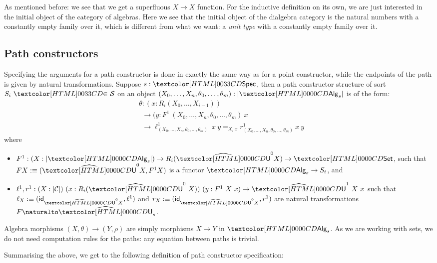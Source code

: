 \begin{remark}
  As mentioned before: we see that we get a superfluous $X \to X$
  function. For the inductive definition on its own, we are just
  interested in the initial object of the category of algebras. Here
  we see that the initial object of the dialgebra category is the
  natural numbers with a constantly empty family over it, which is
  different from what we want: a \emph{unit type} with a constantly
  empty family over it.
\end{remark}

\subsection{Path constructors}
\label{path-constructors}

Specifying the arguments for a path constructor is done in exactly the
same way as for a point constructor, while the endpoints of the path
is given by natural transformations. Suppose $s : \specty$, then a path
constructor structure of sort $\sortsin{S_i}{\Ss}$ on an object
$(X_0, \hdots, X_n, \theta_0,\hdots,\theta_m) : | \Alg_s |$ is of the
form:
\begin{align*}
  &\theta : (x : R_i (X_0, \hdots, X_{i-1})) \\
  &\ \ \to (y : F^1\ (X_0, \hdots, X_n, \theta_0, \hdots, \theta_m)\ x \\
  &\ \ \to \ell^1_{(X_0,\hdots,X_n,\theta_0,\hdots,\theta_m)}\ x\ y =_{X_i\ x} r^1_{(X_0,\hdots,X_n,\theta_0,\hdots,\theta_m)}\ x\ y 
\end{align*}
where
\begin{itemize}
\item $F^1 : (X : | \Alg_s |) \to R_i (\extendfunc{\Und}^0 X) \to \Set$, such
  that $F X \ddefeq (\extendfunc{\Und}^0 X, F^1 X)$ is a functor $\Alg_s \to S_i$, and
\item
  $\ell^1, r^1 : (X : | \Cc |)\ (x : R_i (\extendfunc{\Und}^0\ X))\ (y : F^1\ X\ x)
  \to \extendfunc{\Und}^1\ X\ x$
  such that $\ell_X \ddefeq (\id_{\extendfunc{\Und}^0 X}, \ell^1)$ and
  $r_X \ddefeq (\id_{\extendfunc{\Und}^0 X}, r^1)$ are natural transformations
  $\Nat{F}{\extendfunc{\Und}_s}$.
\end{itemize}
Algebra morphisms $(X,\theta) \to (Y,\rho)$ are simply morphisms
$X \to Y$ in $\Alg_s$. As we are working with sets, we do not need
computation rules for the paths: any equation between paths is
trivial.

Summarising the above, we get to the following definition of
path constructor specification:

